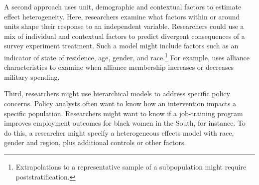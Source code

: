 \documentclass[12pt]{article}
\begin{document}
A second approach uses unit, demographic and contextual factors to estimate effect heterogeneity. 
Here, researchers examine what factors within or around units shape their response to an independent variable.
Researchers could use a mix of individual and contextual factors to predict divergent consequences of a survey experiment treatment. 
Such a model might include factors such as an indicator of state of residence, age, gender, and race.\footnote{Extrapolations to a representative sample of a subpopulation might require poststratification.}
For example, \citet{Alley2021isq} uses alliance characteristics to examine when alliance membership increases or decreases military spending.


Third, researchers might use hierarchical models to address specific policy concerns.
Policy analysts often want to know how an intervention impacts a specific population. 
Researchers might want to know if a job-training program improves employment outcomes for black women in the South, for instance.  
To do this, a researcher might specify a heterogeneous effects model with race, gender and region, plus additional controls or other factors.


\end{document}
